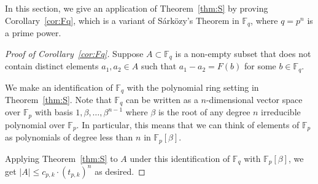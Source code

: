 \documentclass[11pt, reqno]{amsart}
\theoremstyle{definition}
\newcommand{\F}{\mathbb{F}}
\begin{document}
In this section, we give an application of Theorem~\ref{thm:S} by proving Corollary~\ref{cor:Fq}, which is a variant of S\'ark\"ozy's Theorem in $\F_q$, where $q = p^n$ is a prime power.

\begin{proof}[Proof of Corollary~\ref{cor:Fq}]
Suppose $A \subset \F_q$ is a non-empty subset that does not contain distinct elements $a_1,a_2 \in A$ such that $a_1 - a_2 = F(b)$ for some $b \in \F_q$.

We make an identification of $\F_q$ with the polynomial ring setting in Theorem~\ref{thm:S}. Note that $\F_q$ can be written as a $n$-dimensional vector space over $\F_p$ with basis $1, \beta, \ldots, \beta^{n-1}$ where $\beta$ is the root of any degree $n$ irreducible polynomial over $\F_p$. In particular, this means that we can think of elements of $\F_p$ as polynomials of degree less than $n$ in $\F_p[\beta]$. 

Applying Theorem~\ref{thm:S} to $A$ under this identification of $\F_q$ with $\F_p[\beta]$, we get $|A| \leq c_{p,k}\cdot (t_{p,k})^n$ as desired. \end{proof}




\end{document}

